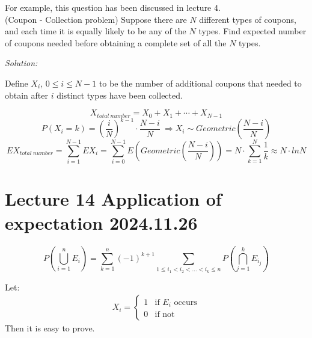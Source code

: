\documentclass{article}
\begin{document}
For example, this question has been discussed in lecture 4.\\
(Coupon - Collection problem) Suppose there are $N$ different types of coupons, and each time it is equally likely to be any of the $N$ types.
Find expected number of coupons needed before obtaining a complete set of all the $N$ types.

\emph{Solution:}

Define $X_{i}$, $0 \leq i \leq N-1$ to be the number of additional coupons that needed to obtain after $i$ distinct types have been collected.

\[X_{total\ number} = X_{0} + X_{1} + \cdots + X_{N-1}\]
\[ P(X_{i} = k) = \left( \frac{i}{N} \right)^{k-1} \cdot \frac{N-i}{N} \ \Rightarrow X_{i} \sim Geometric\left(\frac{N-i}{N}\right)\]
\[ EX_{total\ number} = \sum_{i=1}^{N-1}EX_{i} = \sum_{i=0}^{N-1}E\left(Geometric\left(\frac{N-i}{N}\right)\right) = N \cdot \sum_{k=1}^{N} \frac{1}{k} \approx N\cdot ln N\]













\section{Lecture 14 Application of expectation 2024.11.26}

\begin{theorem}
    \begin{equation*}
        P(\bigcup^n_{i=1}E_i) = \sum^n_{k=1}(-1)^{k+1}\sum_{1\leq i_1 < i_2 < \dots < i_k \leq n} P(\bigcap^k_{j=1}E_{i_j})
    \end{equation*}
\end{theorem}

Let:
\begin{align*}
    X_i = 
    \begin{cases}
        1 & \text{if } E_i \text{ occurs} \\
        0 & \text{if not} 
    \end{cases}
\end{align*}
Then it is easy to prove.
\end{document}
